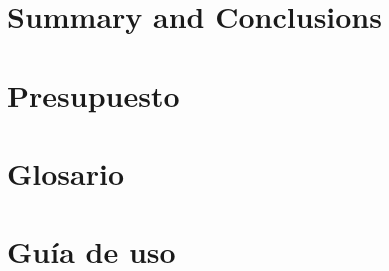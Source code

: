\documentclass[spanish,a4paper,14pt,oneside]{extreport}
\begin{document}


\newpage{\pagestyle{empty}}
\thispagestyle{empty}

\chapter{Summary and Conclusions }
\label{chapter:ingles}



\newpage{\pagestyle{empty}}
\thispagestyle{empty}

\chapter{Presupuesto}
\label{chapter:presupuesto}



\newpage{\pagestyle{empty}}
\thispagestyle{empty}
\begin{appendix}

\chapter{Glosario}
\label{appendix:1}


\chapter{Guía de uso}
\label{appendix:2}


\end{appendix}

\clearpage
{}

\printindex



\nocite{*}

\end{document}
